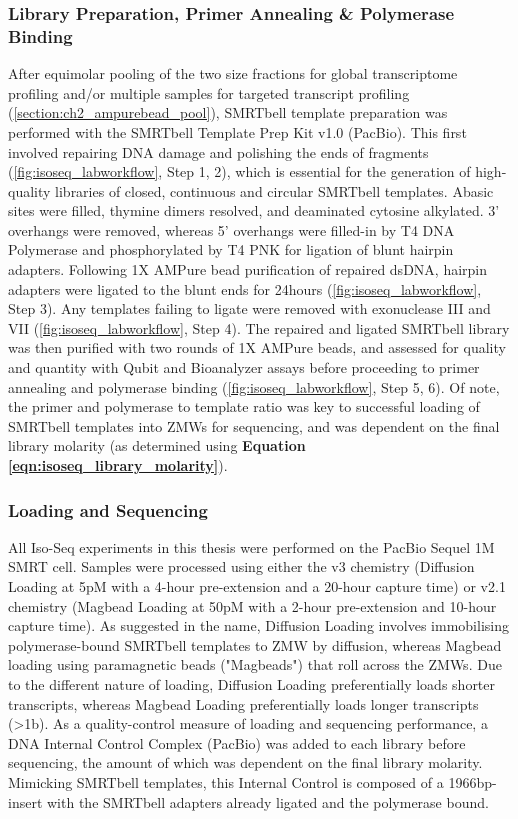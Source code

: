 \subsubsection{Library Preparation, Primer Annealing \& Polymerase Binding}
\label{section:ch2_smrtbelltemplate_explanation} 
After equimolar pooling of the two size fractions for global transcriptome profiling and/or multiple samples for targeted transcript profiling (\cref{section:ch2_ampurebead_pool}), SMRTbell template preparation was performed with the SMRTbell Template Prep Kit v1.0 (PacBio). This first involved repairing DNA damage and polishing the ends of fragments (\cref{fig:isoseq_labworkflow}, Step 1, 2), which is essential for the generation of high-quality libraries of closed, continuous and circular SMRTbell templates. Abasic sites were filled, thymine dimers resolved, and deaminated cytosine alkylated. 3’ overhangs were removed, whereas 5’ overhangs were filled-in by T4 DNA Polymerase and phosphorylated by T4 PNK for ligation of blunt hairpin adapters. Following 1X AMPure bead purification of repaired dsDNA, hairpin adapters were ligated to the blunt ends for 24hours (\cref{fig:isoseq_labworkflow}, Step 3). Any templates failing to ligate were removed with exonuclease III and VII (\cref{fig:isoseq_labworkflow}, Step 4). The repaired and ligated SMRTbell library was then purified with two rounds of 1X AMPure beads, and assessed for quality and quantity with Qubit and Bioanalyzer assays before proceeding to primer annealing and polymerase binding (\cref{fig:isoseq_labworkflow}, Step 5, 6). Of note, the primer and polymerase to template ratio was key to successful loading of SMRTbell templates into ZMWs for sequencing, and was dependent on the final library molarity (as determined using \textbf{Equation \ref{eqn:isoseq_library_molarity}}). 


\subsubsection{Loading and Sequencing} 
\label{section:ch2_sequencing}
All Iso-Seq experiments in this thesis were performed on the PacBio Sequel 1M SMRT cell. Samples were processed using either the v3 chemistry (Diffusion Loading at 5pM with a 4-hour pre-extension and a 20-hour capture time) or v2.1 chemistry (Magbead Loading at 50pM with a 2-hour pre-extension and 10-hour capture time). As suggested in the name, Diffusion Loading involves immobilising polymerase-bound SMRTbell templates to ZMW by diffusion, whereas Magbead loading using paramagnetic beads ("Magbeads") that roll across the ZMWs. Due to the different nature of loading, Diffusion Loading preferentially loads shorter transcripts, whereas Magbead Loading preferentially loads longer transcripts (>1b). As a quality-control measure of loading and sequencing performance, a DNA Internal Control Complex (PacBio) was added to each library before sequencing, the amount of which was dependent on the final library molarity. Mimicking SMRTbell templates, this Internal Control is composed of a 1966bp-insert with the SMRTbell adapters already ligated and the  polymerase bound.


